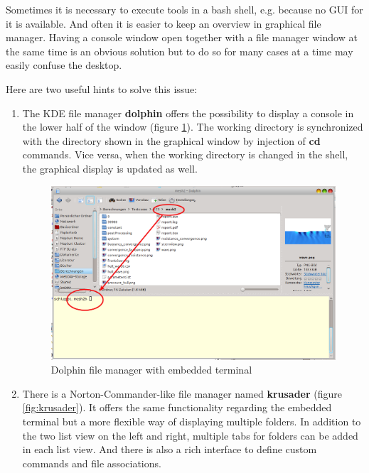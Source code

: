 Sometimes it is necessary to execute tools in a bash shell, e.g. because no GUI for it is available. And often it is easier to keep an overview in graphical file manager.
Having a console window open together with a file manager window at the same time is an obvious solution but to do so for many cases at a time may easily confuse the desktop. 

Here are two useful hints to solve this issue:
 
\begin{enumerate}

 \item The KDE file manager \textbf{dolphin} offers the possibility to display a console in the lower half of the window (figure \ref{fig:dolphin}). The working directory is synchronized with the directory shown in the graphical window by injection of \textbf{cd} commands. Vice versa, when the working directory is changed in the shell, the graphical display is updated as well.
 
 \begin{figure}[h!]
 \includegraphics[width=\linewidth]{figs/intro/dolphin_with_terminal} 
 \caption{Dolphin file manager with embedded terminal}
 \label{fig:dolphin}
 \end{figure}

 \item There is a Norton-Commander-like file manager named \textbf{krusader} (figure \ref{fig:krusader}). It offers the same functionality regarding the embedded terminal but a more flexible way of displaying multiple folders. In addition to the two list view on the left and right, multiple tabs for folders can be added in each list view. And there is also a rich interface to define custom commands and file associations.
 

\end{enumerate}
